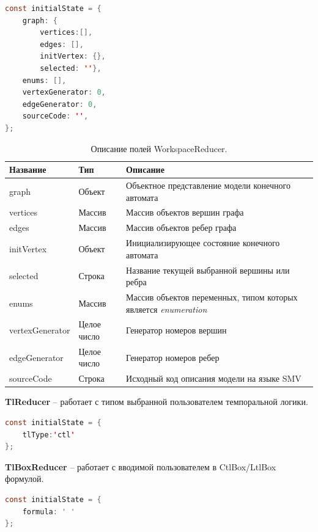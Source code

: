 \begin{lstlisting}[language=Java,
caption={Инициализация состояния WorkspaceReducer.}]
const initialState = {
	graph: {
		vertices:[],
		edges: [],
		initVertex: {},
		selected: ''},
	enums: [],
	vertexGenerator: 0,
	edgeGenerator: 0,
	sourceCode: '',
};
\end{lstlisting}

\begin{table}[ht]
	\caption{Описание полей WorkspaceReducer.}\label{tab:workspace}
	\centering
	\begin{tabular}{|m{2.5 cm}|m{1.5 cm}|m{4.75 cm}|}
		\hline
		Название & Тип & Описание \\
		\hline
		graph & Объект & Объектное представление модели конечного автомата \\
		\hline
		vertices & Массив & Массив объектов вершин графа \\
		\hline
		edges & Массив & Массив объектов ребер графа \\
		\hline
		initVertex & Объект & Инициализирующее состояние конечного автомата \\
		\hline
		selected & Строка & Название текущей выбранной вершины или ребра \\
		\hline
		enums & Массив & Массив объектов переменных, типом которых является \textit{enumeration} \\
		\hline
		vertexGenerator & Целое число & Генератор номеров вершин \\
		\hline
		edgeGenerator & Целое число & Генератор номеров ребер \\
		\hline
		sourceCode & Строка & Исходный код описания модели на языке SMV \\
		\hline
	\end{tabular}
\end{table}

\textbf{TlReducer} -- работает с типом выбранной пользователем темпоральной логики.

\begin{lstlisting}[language=Java,
caption={Инициализация состояния TlReducer.}]
const initialState = {
	tlType:'ctl'
};
\end{lstlisting}

\textbf{TlBoxReducer} -- работает с вводимой пользователем в CtlBox/LtlBox формулой.

\newpage

\begin{lstlisting}[language=Java,
caption={Инициализация состояния TlBoxReducer.}]
const initialState = {
	formula: ' '
};
\end{lstlisting}

